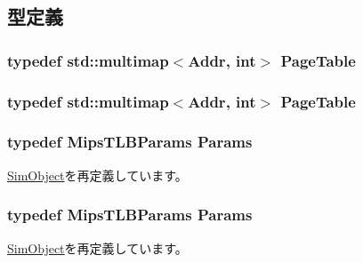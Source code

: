 \subsection{型定義}
\hypertarget{classMipsISA_1_1TLB_a18f97eb978c56b976c0eadbf9212d206}{
\subsubsection[{PageTable}]{\setlength{\rightskip}{0pt plus 5cm}typedef std::multimap$<${\bf Addr}, int$>$ {\bf PageTable}}}
\label{classMipsISA_1_1TLB_a18f97eb978c56b976c0eadbf9212d206}
\hypertarget{classMipsISA_1_1TLB_a18f97eb978c56b976c0eadbf9212d206}{
\subsubsection[{PageTable}]{\setlength{\rightskip}{0pt plus 5cm}typedef std::multimap$<${\bf Addr}, int$>$ {\bf PageTable}}}
\label{classMipsISA_1_1TLB_a18f97eb978c56b976c0eadbf9212d206}
\hypertarget{classMipsISA_1_1TLB_a8fcac7e147ea0cf7183de360adcb6efe}{
\subsubsection[{Params}]{\setlength{\rightskip}{0pt plus 5cm}typedef MipsTLBParams {\bf Params}}}
\label{classMipsISA_1_1TLB_a8fcac7e147ea0cf7183de360adcb6efe}


\hyperlink{classSimObject_a0f0761d2db586a23bb2a2880b8f387bb}{SimObject}を再定義しています。\hypertarget{classMipsISA_1_1TLB_a8fcac7e147ea0cf7183de360adcb6efe}{
\subsubsection[{Params}]{\setlength{\rightskip}{0pt plus 5cm}typedef MipsTLBParams {\bf Params}}}
\label{classMipsISA_1_1TLB_a8fcac7e147ea0cf7183de360adcb6efe}


\hyperlink{classSimObject_a0f0761d2db586a23bb2a2880b8f387bb}{SimObject}を再定義しています。

